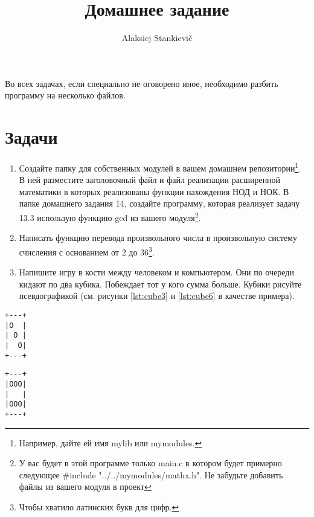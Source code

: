 \documentclass[12pt]{article}
\author{Alaksiej Stankievič}
\title{Домашнее задание}
\begin{document}

Во всех задачах, если специально не оговорено иное, необходимо разбить программу на несколько файлов.

\section{Задачи}

\begin{enumerate}
 \item Создайте папку для собственных модулей в вашем домашнем репозитории\footnote{Например, дайте ей имя mylib или mymodules.}. В ней разместите заголовочный файл и файл реализации расширенной математики в которых реализованы функции нахождения НОД и НОК. В папке домашнего задания 14, создайте программу, которая реализует задачу 13.3 использую функцию gcd из вашего модуля\footnote{У вас будет в этой программе только main.c в котором будет примерно следующее \#include "../../mymodules/mathx.h". Не забудьте добавить файлы из вашего модуля в проект}.
 \item Написать функцию перевода произвольного числа в произвольную систему счисления с основанием от 2 до 36\footnote{Чтобы хватило латинских букв для цифр.}.
 \item Напишите игру в кости между человеком и компьютером. Они по очереди кидают по два кубика. Побеждает тот у кого сумма больше. Кубики рисуйте псевдографикой (см. рисунки \ref{lst:cube3} и \ref{lst:cube6} в качестве примера).
\end{enumerate}

\begin{listing}[H]
\begin{center}
\begin{verbatim}
+---+
|O  |
| O |
|  O|
+---+
\end{verbatim}
\end{center}
\caption{Кубик 3}
\label{lst:cube3}
\end{listing}

\begin{listing}[H]
\begin{center}
\begin{verbatim}
+---+
|OOO|
|   |
|OOO|
+---+
\end{verbatim}
\end{center}
\caption{Кубик 6}
\label{lst:cube6}
\end{listing}
\end{document}
